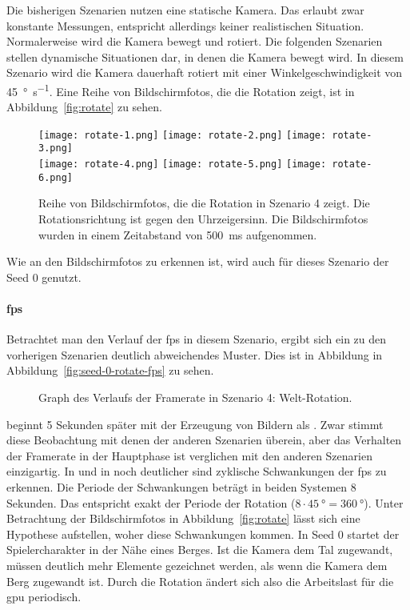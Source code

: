 Die bisherigen Szenarien nutzen eine statische Kamera. Das erlaubt zwar konstante Messungen, entspricht allerdings keiner realistischen Situation. Normalerweise wird die Kamera bewegt und rotiert. Die folgenden Szenarien stellen dynamische Situationen dar, in denen die Kamera bewegt wird. In diesem Szenario wird die Kamera dauerhaft rotiert mit einer Winkelgeschwindigkeit von \SI{45}{\degree\per\second}. Eine Reihe von Bildschirmfotos, die die Rotation zeigt, ist in Abbildung~\vref{fig:rotate} zu sehen.
\begin{figure}
	\centering
	\texttt{[image: rotate-1.png]}
	\texttt{[image: rotate-2.png]}
	\texttt{[image: rotate-3.png]}\\[4pt]
	\texttt{[image: rotate-4.png]}
	\texttt{[image: rotate-5.png]}
	\texttt{[image: rotate-6.png]}
	\caption{Reihe von Bildschirmfotos, die die Rotation in Szenario 4 zeigt. Die Rotationsrichtung ist gegen den Uhrzeigersinn. Die Bildschirmfotos wurden in einem Zeitabstand von \SI{500}{\milli\second} aufgenommen.}\label{fig:rotate}
\end{figure}
Wie an den Bildschirmfotos zu erkennen ist, wird auch für dieses Szenario der Seed 0 genutzt.

\paragraph{\ac{fps}}
Betrachtet man den Verlauf der \ac{fps} in diesem Szenario, ergibt sich ein zu den vorherigen Szenarien deutlich abweichendes Muster. Dies ist in Abbildung in Abbildung~\vref{fig:seed-0-rotate-fps} zu sehen.
\begin{figure}[!htbp]
	\caption{Graph des Verlaufs der Framerate in Szenario 4: Welt-Rotation.}\label{fig:seed-0-rotate-fps}
\end{figure}
\sysB{} beginnt 5 Sekunden später mit der Erzeugung von Bildern als \sysA{}. Zwar stimmt diese Beobachtung mit denen der anderen Szenarien überein, aber das Verhalten der Framerate in der Hauptphase ist verglichen mit den anderen Szenarien einzigartig. In \sysA{} und in \sysB{} noch deutlicher sind zyklische Schwankungen der \ac{fps} zu erkennen. Die Periode der Schwankungen beträgt in beiden Systemen 8 Sekunden. Das entspricht exakt der Periode der Rotation ($8\cdot \SI{45}{\degree} = \SI{360}{\degree}$). Unter Betrachtung der Bildschirmfotos in Abbildung~\vref{fig:rotate} lässt sich eine Hypothese aufstellen, woher diese Schwankungen kommen. In Seed 0 startet der Spielercharakter in der Nähe eines Berges. Ist die Kamera dem Tal zugewandt, müssen deutlich mehr Elemente gezeichnet werden, als wenn die Kamera dem Berg zugewandt ist. Durch die Rotation ändert sich also die Arbeitslast für die \ac{gpu} periodisch.

